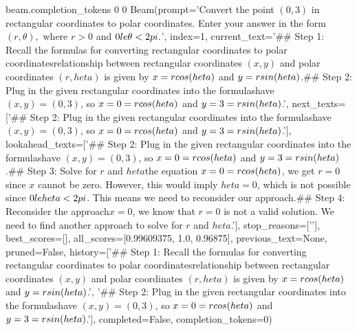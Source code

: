beam.completion_tokens
0
0
Beam(prompt='Convert the point $(0,3)$ in rectangular coordinates to polar coordinates.  Enter your answer in the form $(r,\theta),$ where $r > 0$ and $0 \\le \theta < 2 \\pi.$', index=1, current_text='## Step 1: Recall the formulas for converting rectangular coordinates to polar coordinates\nThe relationship between rectangular coordinates $(x,y)$ and polar coordinates $(r,heta)$ is given by $x = r\\cos(heta)$ and $y = r\\sin(heta)$.\n\n## Step 2: Plug in the given rectangular coordinates into the formulas\nWe have $(x,y) = (0,3)$, so $x = 0 = r\\cos(heta)$ and $y = 3 = r\\sin(heta)$.\n\n', next_texts=['## Step 2: Plug in the given rectangular coordinates into the formulas\nWe have $(x,y) = (0,3)$, so $x = 0 = r\\cos(heta)$ and $y = 3 = r\\sin(heta)$.\n\n'], lookahead_texts=['## Step 2: Plug in the given rectangular coordinates into the formulas\nWe have $(x,y) = (0,3)$, so $x = 0 = r\\cos(heta)$ and $y = 3 = r\\sin(heta)$.\n\n## Step 3: Solve for $r$ and $heta$\nFrom the equation $x = 0 = r\\cos(heta)$, we get $r = 0$ since $x$ cannot be zero. However, this would imply $heta = 0$, which is not possible since $0 \\le heta < 2\\pi$. This means we need to reconsider our approach.\n\n## Step 4: Reconsider the approach\nSince $x = 0$, we know that $r = 0$ is not a valid solution. We need to find another approach to solve for $r$ and $heta$.\n\n'], stop_reasons=['\n\n'], best_scores=[], all_scores=[0.99609375, 1.0, 0.96875], previous_text=None, pruned=False, history=['## Step 1: Recall the formulas for converting rectangular coordinates to polar coordinates\nThe relationship between rectangular coordinates $(x,y)$ and polar coordinates $(r,heta)$ is given by $x = r\\cos(heta)$ and $y = r\\sin(heta)$.\n\n', '## Step 2: Plug in the given rectangular coordinates into the formulas\nWe have $(x,y) = (0,3)$, so $x = 0 = r\\cos(heta)$ and $y = 3 = r\\sin(heta)$.\n\n'], completed=False, completion_tokens=0)
